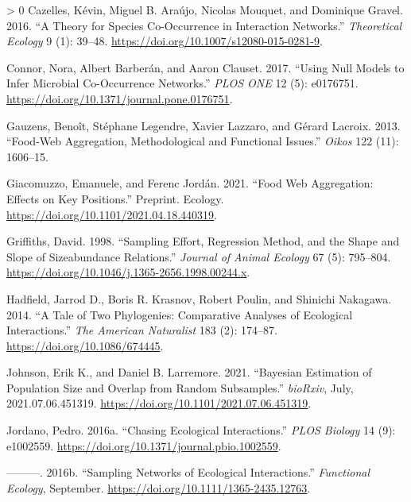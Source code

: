 \documentclass[10pt,oneside]{article}
\newlength{\cslhangindent}
\newenvironment{CSLReferences}[3] %
 {%
  \setlength{\parindent}{0pt}
  \ifodd #1 \everypar{\setlength{\hangindent}{\cslhangindent}}\ignorespaces\fi
  \ifnum #2 > 0
  \setlength{\parskip}{#2\baselineskip}
  \fi
 }%
 {}
\begin{document}
\begin{CSLReferences}{1}{0}
\leavevmode\hypertarget{ref-Cazelles2016TheSpe}{}%
Cazelles, Kévin, Miguel B. Araújo, Nicolas Mouquet, and Dominique
Gravel. 2016. {``A Theory for Species Co-Occurrence in Interaction
Networks.''} \emph{Theoretical Ecology} 9 (1): 39--48.
\url{https://doi.org/10.1007/s12080-015-0281-9}.

\leavevmode\hypertarget{ref-Connor2017UsiNul}{}%
Connor, Nora, Albert Barberán, and Aaron Clauset. 2017. {``Using Null
Models to Infer Microbial Co-Occurrence Networks.''} \emph{PLOS ONE} 12
(5): e0176751. \url{https://doi.org/10.1371/journal.pone.0176751}.

\leavevmode\hypertarget{ref-Gauzens2013FooAgg}{}%
Gauzens, Benoît, Stéphane Legendre, Xavier Lazzaro, and Gérard Lacroix.
2013. {``Food-Web Aggregation, Methodological and Functional Issues.''}
\emph{Oikos} 122 (11): 1606--15.

\leavevmode\hypertarget{ref-Giacomuzzo2021FooWeb}{}%
Giacomuzzo, Emanuele, and Ferenc Jordán. 2021. {``Food Web Aggregation:
Effects on Key Positions.''} Preprint. Ecology.
\url{https://doi.org/10.1101/2021.04.18.440319}.

\leavevmode\hypertarget{ref-Griffiths1998SamEff}{}%
Griffiths, David. 1998. {``Sampling Effort, Regression Method, and the
Shape and Slope of Sizeabundance Relations.''} \emph{Journal of Animal
Ecology} 67 (5): 795--804.
\url{https://doi.org/10.1046/j.1365-2656.1998.00244.x}.

\leavevmode\hypertarget{ref-Hadfield2014TalTwo}{}%
Hadfield, Jarrod D., Boris R. Krasnov, Robert Poulin, and Shinichi
Nakagawa. 2014. {``A Tale of Two Phylogenies: Comparative Analyses of
Ecological Interactions.''} \emph{The American Naturalist} 183 (2):
174--87. \url{https://doi.org/10.1086/674445}.

\leavevmode\hypertarget{ref-Johnson2021BayEst}{}%
Johnson, Erik K., and Daniel B. Larremore. 2021. {``Bayesian Estimation
of Population Size and Overlap from Random Subsamples.''}
\emph{bioRxiv}, July, 2021.07.06.451319.
\url{https://doi.org/10.1101/2021.07.06.451319}.

\leavevmode\hypertarget{ref-Jordano2016ChaEco}{}%
Jordano, Pedro. 2016a. {``Chasing Ecological Interactions.''} \emph{PLOS
Biology} 14 (9): e1002559.
\url{https://doi.org/10.1371/journal.pbio.1002559}.

\leavevmode\hypertarget{ref-Jordano2016SamNet}{}%
---------. 2016b. {``Sampling Networks of Ecological Interactions.''}
\emph{Functional Ecology}, September.
\url{https://doi.org/10.1111/1365-2435.12763}.


\end{CSLReferences}
\end{document}
